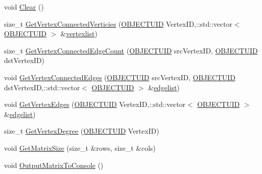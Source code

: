 \begin{DoxyCompactItemize}
\item 
void \hyperlink{class_n_m_1_1_o_d_b_1_1_c_adjacency_matrix_ac9d09accdbb67dcf8762da978bd4f828}{Clear} ()
\item 
size\+\_\+t \hyperlink{class_n_m_1_1_o_d_b_1_1_c_adjacency_matrix_a13acffafe60d081aa33cd572c2437cf2}{Get\+Vertex\+Connected\+Verticies} (\hyperlink{namespace_n_m_1_1_o_d_b_a262b64fab56baaa96e18bac4ada88265}{O\+B\+J\+E\+C\+T\+U\+I\+D} Vertex\+I\+D,\+::std\+::vector$<$ \hyperlink{namespace_n_m_1_1_o_d_b_a262b64fab56baaa96e18bac4ada88265}{O\+B\+J\+E\+C\+T\+U\+I\+D} $>$ \&\hyperlink{class_n_m_1_1_o_d_b_1_1_c_adjacency_matrix_a483ee6ddd603d9ec66d5f21d0f11ff03}{vertexlist})
\item 
size\+\_\+t \hyperlink{class_n_m_1_1_o_d_b_1_1_c_adjacency_matrix_a83d73a80157035ae5dff7374745b581a}{Get\+Vertex\+Connected\+Edge\+Count} (\hyperlink{namespace_n_m_1_1_o_d_b_a262b64fab56baaa96e18bac4ada88265}{O\+B\+J\+E\+C\+T\+U\+I\+D} src\+Vertex\+I\+D, \hyperlink{namespace_n_m_1_1_o_d_b_a262b64fab56baaa96e18bac4ada88265}{O\+B\+J\+E\+C\+T\+U\+I\+D} dst\+Vertex\+I\+D)
\item 
void \hyperlink{class_n_m_1_1_o_d_b_1_1_c_adjacency_matrix_ad183137a9098789b779d698bf45cae24}{Get\+Vertex\+Connected\+Edges} (\hyperlink{namespace_n_m_1_1_o_d_b_a262b64fab56baaa96e18bac4ada88265}{O\+B\+J\+E\+C\+T\+U\+I\+D} src\+Vertex\+I\+D, \hyperlink{namespace_n_m_1_1_o_d_b_a262b64fab56baaa96e18bac4ada88265}{O\+B\+J\+E\+C\+T\+U\+I\+D} dst\+Vertex\+I\+D,\+::std\+::vector$<$ \hyperlink{namespace_n_m_1_1_o_d_b_a262b64fab56baaa96e18bac4ada88265}{O\+B\+J\+E\+C\+T\+U\+I\+D} $>$ \&\hyperlink{class_n_m_1_1_o_d_b_1_1_c_adjacency_matrix_ab898e602bacf35a9600621408c1fde25}{edgelist})
\item 
void \hyperlink{class_n_m_1_1_o_d_b_1_1_c_adjacency_matrix_a72db29148daa6a3b4910ac6387e1f089}{Get\+Vertex\+Edges} (\hyperlink{namespace_n_m_1_1_o_d_b_a262b64fab56baaa96e18bac4ada88265}{O\+B\+J\+E\+C\+T\+U\+I\+D} Vertex\+I\+D,\+::std\+::vector$<$ \hyperlink{namespace_n_m_1_1_o_d_b_a262b64fab56baaa96e18bac4ada88265}{O\+B\+J\+E\+C\+T\+U\+I\+D} $>$ \&\hyperlink{class_n_m_1_1_o_d_b_1_1_c_adjacency_matrix_ab898e602bacf35a9600621408c1fde25}{edgelist})
\item 
size\+\_\+t \hyperlink{class_n_m_1_1_o_d_b_1_1_c_adjacency_matrix_a43b0a584fc5d0a41e00dd5f035997bb1}{Get\+Vertex\+Degree} (\hyperlink{namespace_n_m_1_1_o_d_b_a262b64fab56baaa96e18bac4ada88265}{O\+B\+J\+E\+C\+T\+U\+I\+D} Vertex\+I\+D)
\item 
void \hyperlink{class_n_m_1_1_o_d_b_1_1_c_adjacency_matrix_a7ae4ee21d0762cce032c053f3c55aaaf}{Get\+Matrix\+Size} (size\+\_\+t \&rows, size\+\_\+t \&cols)
\item 
void \hyperlink{class_n_m_1_1_o_d_b_1_1_c_adjacency_matrix_a76db9fc9c3204f188e2de2329367e626}{Output\+Matrix\+To\+Console} ()
\end{DoxyCompactItemize}


